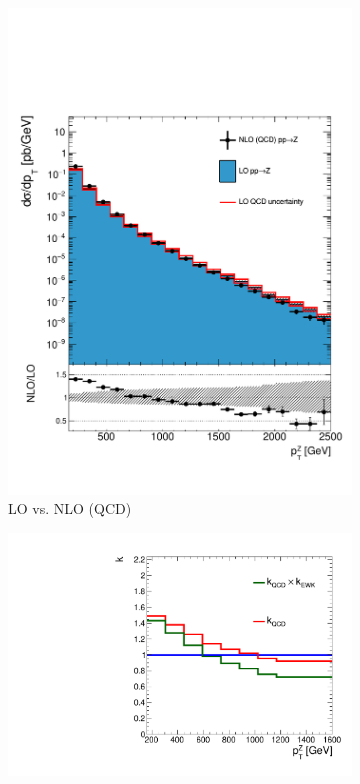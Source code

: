\begin{figure}[]
    \begin{center}
        \begin{subfigure}[t]{0.49\textwidth}
            \includegraphics[width=\textwidth]{figures/monotop/kfactors/zpt_logy.pdf}
            \caption{LO vs. NLO (QCD)}
        \end{subfigure}
        \begin{subfigure}[t]{0.49\textwidth}
            \includegraphics[width=\textwidth]{figures/monotop/kfactors/zcorr_ptv.pdf}

\end{subfigure}
\end{center}
\end{figure}

